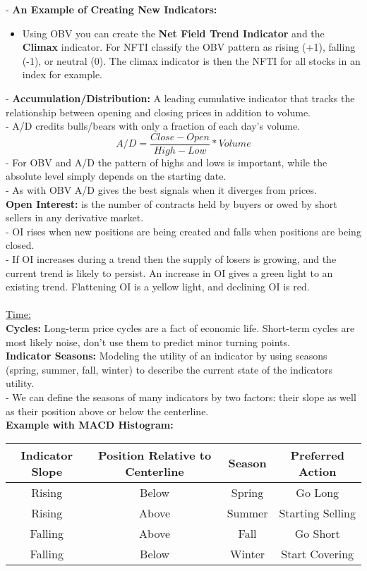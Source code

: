 \documentclass[12pt,fullpage]{article}
\begin{document}
- \textbf{An Example of Creating New Indicators:}
\begin{itemize}
   \itemsep0em
   \item Using OBV you can create the \textbf{Net Field Trend Indicator} and the \textbf{Climax} indicator. For NFTI classify the OBV pattern as rising (+1), falling (-1), or neutral (0). The climax indicator is then the NFTI for all stocks in an index for example.
\end{itemize}
- \textbf{Accumulation/Distribution:} A leading cumulative indicator that tracks the relationship between opening and closing prices in addition to volume.\\
- A/D credits bulls/bears with only a fraction of each day's volume. \[A/D = \frac{Close - Open}{High - Low} * Volume\]
- For OBV and A/D the pattern of highs and lows is important, while the absolute level simply depends on the starting date.\\
- As with OBV A/D gives the best signals when it diverges from prices.\\
\textbf{Open Interest:} is the number of contracts held by buyers or owed by short sellers in any derivative market.\\
- OI rises when new positions are being created and falls when positions are being closed.\\
- If OI increases during a trend then the supply of losers is growing, and the current trend is likely to persist. An increase in OI gives a green light to an existing trend. Flattening OI is a yellow light, and declining OI is red.\\
\\
\underline{Time:}\\
\textbf{Cycles:} Long-term price cycles are a fact of economic life. Short-term cycles are most likely noise, don't use them to predict minor turning points.\\
\textbf{Indicator Seasons:} Modeling the utility of an indicator by using seasons (spring, summer, fall, winter) to describe the current state of the indicators utility.\\
- We can define the seasons of many indicators by two factors: their slope as well as their position above or below the centerline.\\
\textbf{Example with MACD Histogram:}
\begin{center}
   \begin{tabular}{|c|c|c|c|}
      \hline
      Indicator Slope & Position Relative to Centerline & Season & Preferred Action \\
      \hline
      Rising & Below & Spring & Go Long \\
      \hline
      Rising & Above & Summer & Starting Selling \\
      \hline
      Falling & Above & Fall & Go Short \\
      \hline
      Falling & Below & Winter & Start Covering \\
      \hline
   \end{tabular}
\end{center}
\end{document}
